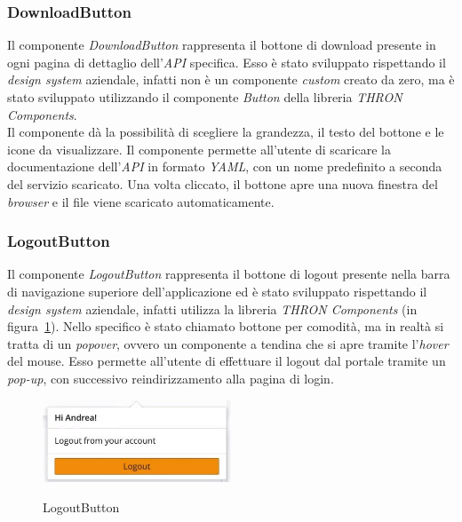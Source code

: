 \subsubsection{DownloadButton}\label{subsubsec:download-button}
Il componente \textit{DownloadButton} rappresenta il bottone di download presente in ogni pagina di dettaglio dell'\textit{API} specifica. Esso è stato sviluppato rispettando il \textit{design system}
aziendale, infatti non è un componente \textit{custom} creato da zero, ma è stato sviluppato utilizzando il componente \textit{Button} della libreria \textit{THRON Components}.\\
Il componente dà la possibilità di scegliere la grandezza, il testo del bottone e le icone da visualizzare.
Il componente permette all'utente di scaricare la documentazione dell'\textit{API} in formato \textit{YAML}, con un nome predefinito a seconda 
del servizio scaricato. Una volta cliccato, il bottone apre una nuova finestra del \textit{browser} e il file viene scaricato automaticamente.\\

\subsubsection{LogoutButton}\label{subsubsec:logout-button}
Il componente \textit{LogoutButton} rappresenta il bottone di logout presente nella barra di navigazione superiore 
dell'applicazione ed è stato sviluppato rispettando il \textit{design system} 
aziendale, infatti utilizza la libreria \textit{THRON Components} (in figura~\ref{fig:logout-button}).
Nello specifico è stato chiamato bottone per comodità, ma in realtà si tratta di un \textit{popover}, ovvero un componente a tendina che si apre
tramite l'\textit{hover} del mouse. Esso permette all'utente di effettuare il logout dal portale tramite un \textit{pop-up}, con successivo reindirizzamento
alla pagina di login.

\begin{figure}[ht]
  \centering
  \includegraphics[width=0.5\textwidth, alt={Popover per il logout dall'applicazione}]{images/frontend/logout.jpg}
  \caption{LogoutButton}\label{fig:logout-button}
\end{figure}

